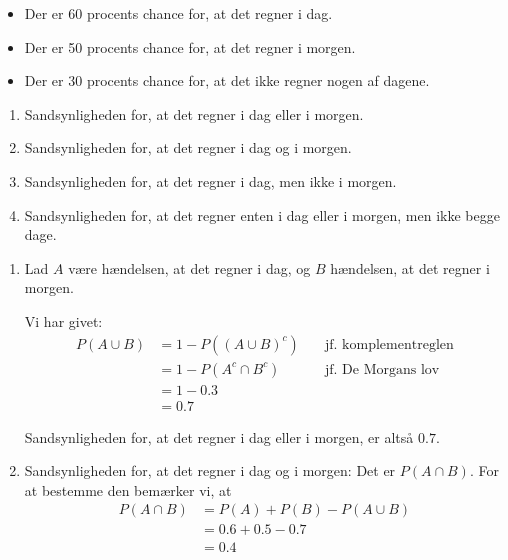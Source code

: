 \begin{example}
    \begin{itemize}
    \item Der er 60 procents chance for, at det regner i dag.
    \item Der er 50 procents chance for, at det regner i morgen.
    \item Der er 30 procents chance for, at det ikke regner nogen af dagene.
    \end{itemize}
    
\begin{enumerate}[label=(\alph*)]
    \item Sandsynligheden for, at det regner i dag eller i morgen.
    \item Sandsynligheden for, at det regner i dag og i morgen.
    \item Sandsynligheden for, at det regner i dag, men ikke i morgen.
    \item Sandsynligheden for, at det regner enten i dag eller i morgen, men ikke begge dage.
\end{enumerate}
    
\begin{solution}
\begin{enumerate}[label=(\alph*)]
    \item     Lad \( A \) være hændelsen, at det regner i dag, og \( B \) hændelsen, at det regner i morgen.
        
    Vi har givet:
    \begin{align*}
        P(A \cup B) &= 1 - P\left((A \cup B)^c\right) \quad &\text{jf. komplementreglen} \\
                &= 1 - P\left(A^c \cap B^c\right) \quad &\text{jf. De Morgans lov} \\
                &= 1 - 0.3 \\
                &= 0.7
    \end{align*}
            
        
    Sandsynligheden for, at det regner i dag eller i morgen, er altså \( 0.7 \).

    \item Sandsynligheden for, at det regner i dag og i morgen: Det er $P(A \cap B)$. For at bestemme den bemærker vi, at
    \begin{align*}
    P(A \cap B) &= P(A) + P(B) - P(A \cup B) \\
                &= 0.6 + 0.5 - 0.7 \\
                &= 0.4
    \end{align*}


\end{enumerate}
\end{solution}
\end{example}
